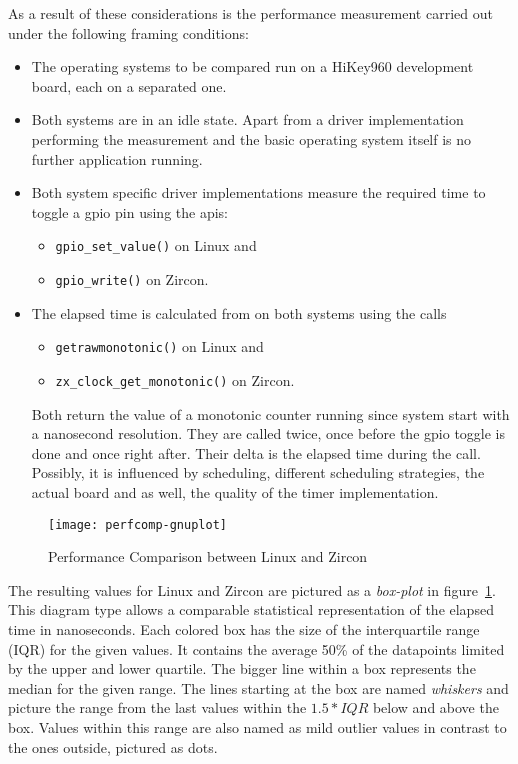 As a result of these considerations is the performance measurement carried out under the following framing conditions:
\begin{itemize}
    \item The operating systems to be compared run on a HiKey960 development board, each on a separated one.
    \item Both systems are in an idle state. Apart from a driver implementation performing the measurement and the basic operating system itself is no further application running.
    \item Both system specific driver implementations measure the required time to toggle a \ac{gpio} pin using the \acp{api}:
        \begin{itemize}
            \item \texttt{gpio_set_value()} on Linux and
            \item \texttt{gpio_write()} on Zircon.
        \end{itemize}
    \item The elapsed time is calculated from on both systems using the calls
        \begin{itemize}
            \item \texttt{getrawmonotonic()} on Linux and
            \item \texttt{zx_clock_get_monotonic()} on Zircon.
        \end{itemize}
        Both return the value of a monotonic counter running since system start with a nanosecond resolution.
        They are called twice, once before the \ac{gpio} toggle is done and once right after.
        Their delta is the elapsed time during the call.
        Possibly, it is influenced by scheduling, different scheduling strategies, the actual board and as well, the quality of the timer implementation.
\end{itemize}

\begin{figure} [t]
    \centering
    \texttt{[image: perfcomp-gnuplot]}
    \caption{Performance Comparison between Linux and Zircon}\label{pic:perftest}
\end{figure}

The resulting values for Linux and Zircon are pictured as a \textit{box-plot} in figure~\ref{pic:perftest}.
This diagram type allows a comparable statistical representation of the elapsed time in nanoseconds.
Each colored box has the size of the interquartile range (IQR) for the given values.
It contains the average 50\% of the datapoints limited by the upper and lower quartile.
The bigger line within a box represents the median for the given range.
The lines starting at the box are named \textit{whiskers} and picture the range from the last values within the $1.5 * IQR$ below and above the box.
Values within this range are also named as mild outlier values in contrast to the ones outside, pictured as dots. 

